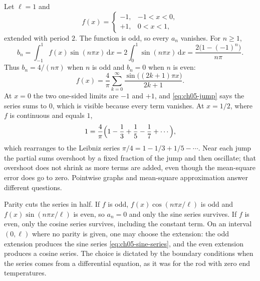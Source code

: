 \begin{example}
Let $\ell=1$ and
\begin{equation}
f(x)=
\begin{cases}
-1,&-1<x<0,\\
+1,&0<x<1,
\end{cases}
\end{equation}
extended with period $2$. The function is odd, so every $a_n$ vanishes. For $n\geq 1$,
\begin{equation}
b_n=\int_{-1}^{1}f(x)\sin(n\pi x)\,\mathrm{d}x
=2\int_0^1\sin(n\pi x)\,\mathrm{d}x
=\frac{2\bigl(1-(-1)^n\bigr)}{n\pi}.
\end{equation}
Thus $b_n=4/(n\pi)$ when $n$ is odd and $b_n=0$ when $n$ is even:
\begin{equation}
f(x)=\frac{4}{\pi}\sum_{k=0}^{\infty}
\frac{\sin\bigl((2k+1)\pi x\bigr)}{2k+1}.
\label{eq:ch05-square}
\end{equation}
At $x=0$ the two one-sided limits are $-1$ and $+1$, and \eqref{eq:ch05-jump} says the series sums to $0$, which is visible because every term vanishes. At $x=1/2$, where $f$ is continuous and equals $1$,
\begin{equation}
1=\frac{4}{\pi}\Bigl(1-\frac13+\frac15-\frac17+\cdots\Bigr),
\end{equation}
which rearranges to the Leibniz series $\pi/4=1-1/3+1/5-\cdots$. Near each jump the partial sums overshoot by a fixed fraction of the jump and then oscillate; that overshoot does not shrink as more terms are added, even though the mean-square error does go to zero. Pointwise graphs and mean-square approximation answer different questions.
\end{example}

Parity cuts the series in half. If $f$ is odd, $f(x)\cos(n\pi x/\ell)$ is odd and $f(x)\sin(n\pi x/\ell)$ is even, so $a_n=0$ and only the sine series survives. If $f$ is even, only the cosine series survives, including the constant term. On an interval $(0,\ell)$ where no parity is given, one may choose the extension: the odd extension produces the sine series \eqref{eq:ch05-sine-series}, and the even extension produces a cosine series. The choice is dictated by the boundary conditions when the series comes from a differential equation, as it was for the rod with zero end temperatures.

